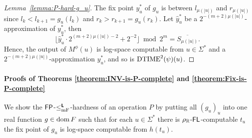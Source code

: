 \documentclass[envcountsame,orivec,oribibl]{llncs}
\begin{document}
\begin{proof}[Lemma~\ref{lemma:P-hard-g_u}]
 The fix point $y^*_u$ of $g_u$ is between $l_{\mu(|u|)}$ and $r_{\mu(|u|)}$ 
 since $l_k < l_{k+1} = g_u(l_k)$ and $r_k > r_{k+1} = g_u(r_k)$.
 Let $\hat y^*_u$ be a $2^{-(m+2)\mu(|u|)}$-approximation of $y^*_u$, then
\begin{equation}
 \lfloor \hat y^*_u \cdot 2^{(m+2)\mu(|u|)-2} + 2^{-2}\rfloor  \bmod 2^m
  =
  \overline{S_{\mu(|u|)}}.
\end{equation}
 Hence, the output of $M^\phi(u)$ is log-space computable from 
 $u \in \Sigma^*$ and a $2^{-(m+2)\mu(|u|)}$-approximation $y^*_u$, and so is
 $\mathrm{DTIME}^2(\psi)(u)$.
\end{proof}


\paragraph{Proofs of Theorems \ref{theorem:INV-is-P-complete} and \ref{theorem:Fix-is-P-complete}}
\label{section:proofs-of-theorems}

We show the $\mathsf{FP}$-$\leq _{\mathrm{mF}} ^{\text{\bfseries \sffamily \upshape L}}$-hardness of an operation $P$
by putting all $(g_u)_u$ into one real function $g \in \mathop{\rm dom} F$
such that for each $u \in \Sigma^*$ there is $\rho _\mathbb R$-$\mathsf{FL}$-computable
$t_u$ the fix point of $g_u$ is log-space computable from $h(t_u)$.
\end{document}

